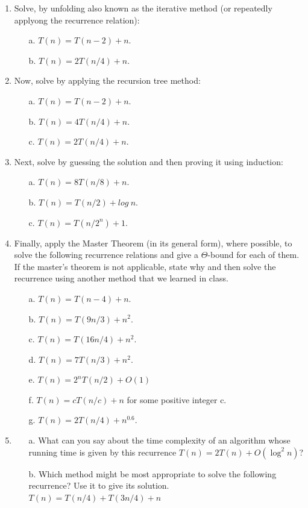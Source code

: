 \documentclass[11pt]{article}
\begin{document}
  \begin{enumerate}
  	\item
  	Solve, by unfolding also known as the iterative method (or repeatedly applyong the recurrence relation):
  \begin{itemize}
  	\item[a.]     $T(n)=T(n-2)+n$.
  	\item[b.] $T(n)=2T(n/4)+n$.
\end{itemize}
   	\item
Now, solve by applying  the recursion tree method:
\begin{itemize}
	\item[a.]     $T(n)=T(n-2)+n$.
		\item[b.] $T(n)=4T(n/4)+n$.
	\item[c.] $T(n)=2T(n/4)+n$.
 
\end{itemize}
   	\item
   	Next, solve by guessing the solution and then proving it using induction:
   	\begin{itemize}
   		\item[a.]     $T(n)=8T(n/8)+n$.
   	   		\item[b.]     $T(n)=T(n/2)+log \ n$.
   	   		  \item[c.]     $T(n)=T(n/2^n) +1$.
   	\end{itemize}
   
  	\item
\noindent  Finally, apply the Master Theorem (in its general form), where possible, to solve the following recurrence relations and give a $\Theta$-bound for each of them. If the master's theorem is not applicable, state why and then solve the recurrence using another method that we learned in class. 
\begin{itemize}
    \item[a.] $T(n)=T(n-4)+n$.
    \item[b.] $T(n)=T(9n/3)+n^2$.
    \item[c.]  $T(n)=T(16n/4)+n^2$.
    \item[d.] $T(n)=7T(n/3)+n^2$.
     \item[e.]$T(n)=2^nT(n/2)+O(1)$
     \item[f.] $T(n)=cT(n/c)+ n$   for some positive integer c.
     \item[g.] $T(n)=2T(n/4)+n^{0.6}$.

   
\end{itemize}
\item
\begin{itemize}
\item[a.]What can you say about the time complexity of an algorithm whose running time is given by this recurrence $T(n)=2T(n)+O(\log^2 n)$?

    \item[b.] Which method might be most appropriate to solve the following recurrence? Use it to give its solution. $T(n)=T(n/4)+T(3n/4)+ n$


\end{itemize}
\end{enumerate}
\end{document}
